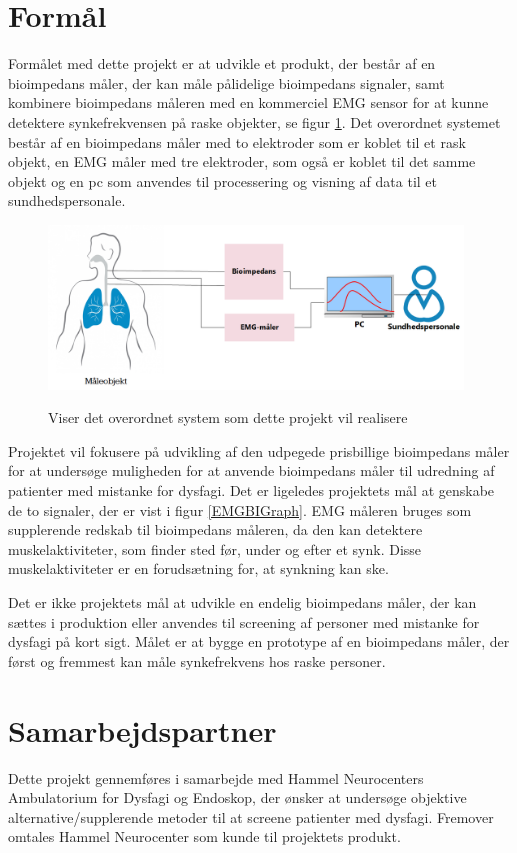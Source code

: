 \section{Formål}

Formålet med dette projekt er at udvikle et produkt, der består af en bioimpedans måler, der kan måle pålidelige bioimpedans signaler, samt kombinere bioimpedans måleren med en kommerciel EMG sensor for at kunne detektere synkefrekvensen på raske objekter, se figur \ref{KonceptuelDiagram}. Det overordnet systemet består af en bioimpedans måler med to elektroder som er koblet til et rask objekt, en EMG måler med tre elektroder, som også er koblet til det samme objekt og en pc som anvendes til processering og visning af data til et sundhedspersonale.  

\begin{figure}[H]
\centering
{\includegraphics[width=11cm]
{Figure/KonceptuelDiagram}}
\caption{Viser det overordnet system som dette projekt vil realisere}
\label{KonceptuelDiagram}
\end{figure}

Projektet vil fokusere på udvikling af den udpegede prisbillige bioimpedans måler for at undersøge muligheden for at anvende bioimpedans måler til udredning af patienter med mistanke for dysfagi. Det er ligeledes projektets mål at genskabe de to signaler, der er vist i figur \ref{EMGBIGraph}. EMG måleren bruges som supplerende redskab til bioimpedans måleren, da den kan detektere muskelaktiviteter, som finder sted før, under og efter et synk. Disse muskelaktiviteter er en forudsætning for, at synkning kan ske. 

Det er ikke projektets mål at udvikle en endelig bioimpedans måler, der kan sættes i produktion eller anvendes til screening af personer med mistanke for dysfagi på kort sigt. Målet er at bygge en prototype af en bioimpedans måler, der først og fremmest kan måle synkefrekvens hos raske personer. 

\section{Samarbejdspartner}
Dette projekt gennemføres i samarbejde med Hammel Neurocenters Ambulatorium for Dysfagi og Endoskop, der ønsker at undersøge objektive alternative/supplerende metoder til at screene patienter med dysfagi. Fremover omtales Hammel Neurocenter som kunde til projektets produkt. 

